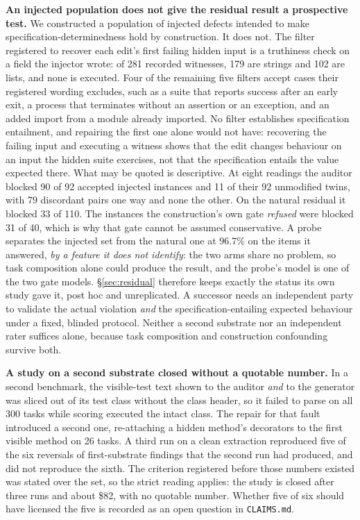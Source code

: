 \textbf{An injected population does not give the residual result a prospective test.} We
constructed a population of injected defects intended to make specification-determinedness hold
by construction. It does not. The filter registered to recover each edit's first failing hidden
input is a truthiness check on a field the injector wrote: of 281 recorded witnesses, 179 are
strings and 102 are lists, and none is executed. Four of the remaining five filters accept cases
their registered wording excludes, such as a suite that reports success after an early exit, a
process that terminates without an assertion or an exception, and an added import from a module
already imported. No filter establishes specification entailment, and repairing the first one
alone would not have: recovering the failing input and executing a witness shows that the edit
changes behaviour on an input the hidden suite exercises, not that the specification entails the
value expected there. What may be quoted is descriptive. At eight readings the auditor blocked
90 of 92 accepted injected instances and 11 of their 92 unmodified twins, with 79 discordant
pairs one way and none the other. On the natural residual it blocked 33 of 110. The instances the construction's own gate \emph{refused} were blocked 31 of 40,
which is why that gate cannot be assumed conservative. A probe separates the injected set from the
natural one at 96.7\% on the items it answered, \emph{by a feature it does not identify}: the two
arms share no problem, so task composition alone could produce the result, and the probe's model
is one of the two gate models. \S\ref{sec:residual} therefore keeps exactly the status its own
study gave it, post hoc and unreplicated. A successor needs an independent party to validate the
actual violation \emph{and} the specification-entailing expected behaviour under a fixed, blinded
protocol. Neither a second substrate nor an independent rater suffices alone, because task
composition and construction confounding survive both.

\textbf{A study on a second substrate closed without a quotable number.} In a second benchmark,
the visible-test text shown to the auditor \emph{and} to the generator was sliced out of its test
class without the class header, so it failed to parse on all 300 tasks while scoring executed the
intact class. The repair for that fault introduced a second one, re-attaching a hidden method's
decorators to the first visible method on 26 tasks. A third run on a clean extraction reproduced
five of the six reversals of first-substrate findings that the second run had produced, and did not
reproduce the sixth. The criterion registered before those numbers existed was stated over the
set, so the strict reading applies: the study is closed after three runs and about \$82, with no
quotable number. Whether five
of six should have licensed the five is recorded as an open question in \texttt{CLAIMS.md}.

